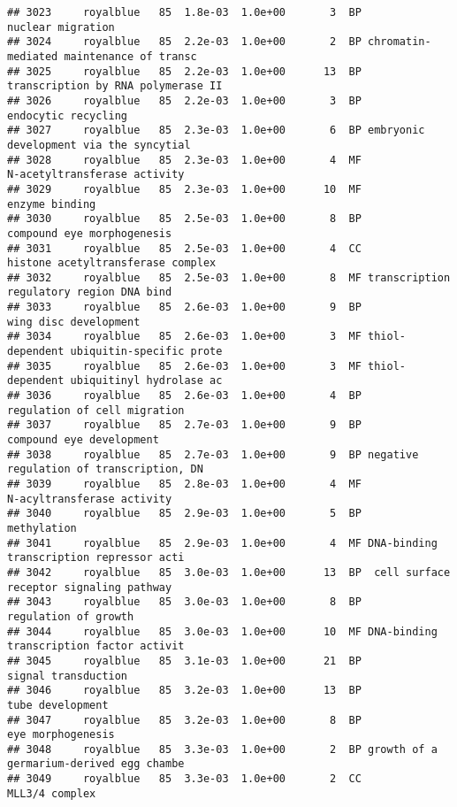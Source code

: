 \documentclass[]{article}
\begin{document}
\begin{verbatim}
## 3023     royalblue   85  1.8e-03  1.0e+00       3  BP                        nuclear migration
## 3024     royalblue   85  2.2e-03  1.0e+00       2  BP chromatin-mediated maintenance of transc
## 3025     royalblue   85  2.2e-03  1.0e+00      13  BP       transcription by RNA polymerase II
## 3026     royalblue   85  2.2e-03  1.0e+00       3  BP                      endocytic recycling
## 3027     royalblue   85  2.3e-03  1.0e+00       6  BP embryonic development via the syncytial 
## 3028     royalblue   85  2.3e-03  1.0e+00       4  MF             N-acetyltransferase activity
## 3029     royalblue   85  2.3e-03  1.0e+00      10  MF                           enzyme binding
## 3030     royalblue   85  2.5e-03  1.0e+00       8  BP               compound eye morphogenesis
## 3031     royalblue   85  2.5e-03  1.0e+00       4  CC        histone acetyltransferase complex
## 3032     royalblue   85  2.5e-03  1.0e+00       8  MF transcription regulatory region DNA bind
## 3033     royalblue   85  2.6e-03  1.0e+00       9  BP                    wing disc development
## 3034     royalblue   85  2.6e-03  1.0e+00       3  MF thiol-dependent ubiquitin-specific prote
## 3035     royalblue   85  2.6e-03  1.0e+00       3  MF thiol-dependent ubiquitinyl hydrolase ac
## 3036     royalblue   85  2.6e-03  1.0e+00       4  BP             regulation of cell migration
## 3037     royalblue   85  2.7e-03  1.0e+00       9  BP                 compound eye development
## 3038     royalblue   85  2.7e-03  1.0e+00       9  BP negative regulation of transcription, DN
## 3039     royalblue   85  2.8e-03  1.0e+00       4  MF               N-acyltransferase activity
## 3040     royalblue   85  2.9e-03  1.0e+00       5  BP                              methylation
## 3041     royalblue   85  2.9e-03  1.0e+00       4  MF DNA-binding transcription repressor acti
## 3042     royalblue   85  3.0e-03  1.0e+00      13  BP  cell surface receptor signaling pathway
## 3043     royalblue   85  3.0e-03  1.0e+00       8  BP                     regulation of growth
## 3044     royalblue   85  3.0e-03  1.0e+00      10  MF DNA-binding transcription factor activit
## 3045     royalblue   85  3.1e-03  1.0e+00      21  BP                      signal transduction
## 3046     royalblue   85  3.2e-03  1.0e+00      13  BP                         tube development
## 3047     royalblue   85  3.2e-03  1.0e+00       8  BP                        eye morphogenesis
## 3048     royalblue   85  3.3e-03  1.0e+00       2  BP growth of a germarium-derived egg chambe
## 3049     royalblue   85  3.3e-03  1.0e+00       2  CC                           MLL3/4 complex

\end{verbatim}
\end{document}
